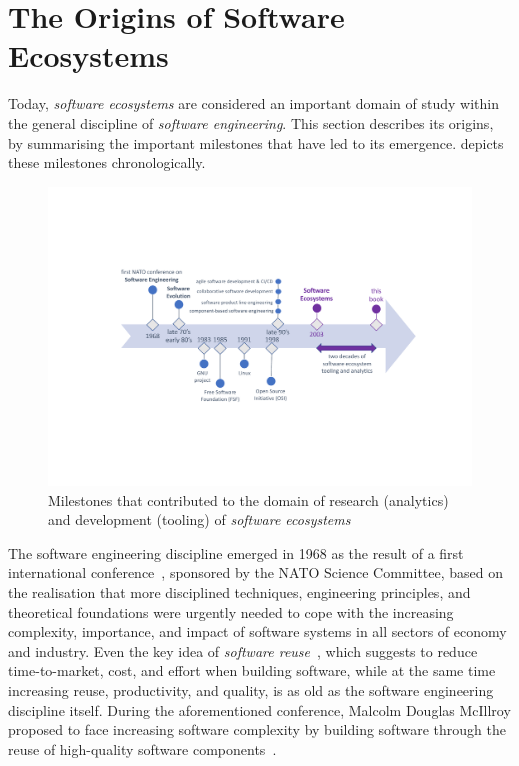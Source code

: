 \section{The Origins of Software Ecosystems}
\label{INT:sec:origin}
Today, \emph{software ecosystems} are considered an important domain of study within the general discipline of \emph{software engineering}. This section describes its origins, by summarising the important milestones that have led to its emergence.
 depicts these milestones chronologically.

\begin{figure}[htbp]
   \centering
   \includegraphics[width=\textwidth]{SECO-history.pdf} %
   \caption{Milestones that contributed to the domain of research (analytics) and development (tooling) of \emph{software ecosystems}}
   \label{INT:fig:milestones}
\end{figure}

The software engineering discipline emerged in 1968 as the result of a first international conference~\cite{Naur1969}, sponsored by the NATO Science Committee, based on the realisation that more disciplined techniques, engineering principles, and theoretical foundations were urgently needed to cope with the increasing complexity, importance, and impact of software systems in all sectors of economy and industry.
Even the key idea of \emph{software reuse}~\cite{Krueger1992,Frakes2005}, which suggests to reduce time-to-market, cost, and effort when building software, while at the same time increasing reuse, productivity, and quality, is as old as the software engineering discipline itself.
During the aforementioned conference, Malcolm Douglas McIllroy proposed to face increasing software complexity by building software through the reuse of high-quality software components~\cite{McIllroy1968}.

